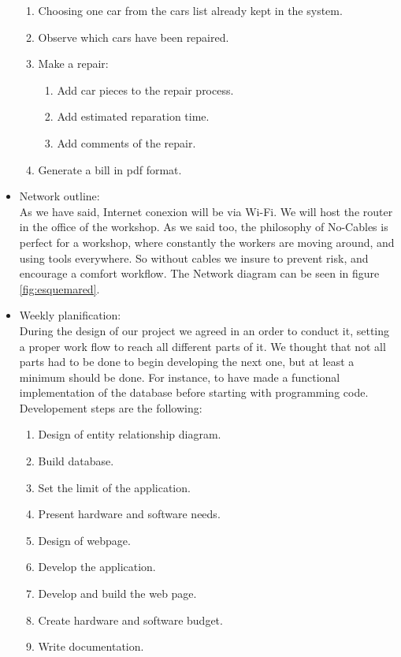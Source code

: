 \documentclass{article}
\begin{document}
\begin{itemize}
\begin{enumerate}
    \item Choosing one car from the cars list already kept in the system.
    \item Observe which cars have been repaired.
    \item Make a repair:
          \begin{enumerate}[label=\alph*]
            \item Add car pieces to the repair process.
            \item Add estimated reparation time.
            \item Add comments of the repair.
          \end{enumerate}
    \item Generate a bill in pdf format.
  \end{enumerate}
  \item Network outline:\\
  As we have said, Internet conexion will be via Wi-Fi. We will host the router in the office of the workshop. As we said too, the philosophy of No-Cables is perfect for a workshop, where constantly the workers are moving around, and using tools everywhere. So without cables we insure to prevent risk, and encourage a comfort workflow. The Network diagram can be seen in figure \ref{fig:esquemared}.
  \item Weekly planification:\\ 
  During the design of our project we agreed in an order to conduct it, setting a proper work flow to reach all different parts of it. We thought that not all parts had to be done to begin developing the next one, but at least a minimum should be done. For instance, to have made a functional implementation of the database before starting with programming code.
  Developement steps are the following:
  \begin{enumerate}
    \item Design of entity relationship diagram.
    \item Build database.
    \item Set the limit of the application.
    \item Present hardware and software needs.
    \item Design of webpage.
    \item Develop the application.
    \item Develop and build the web page.
    \item Create hardware and software budget.
    \item Write documentation.
  \end{enumerate}

\end{itemize}
\end{document}
